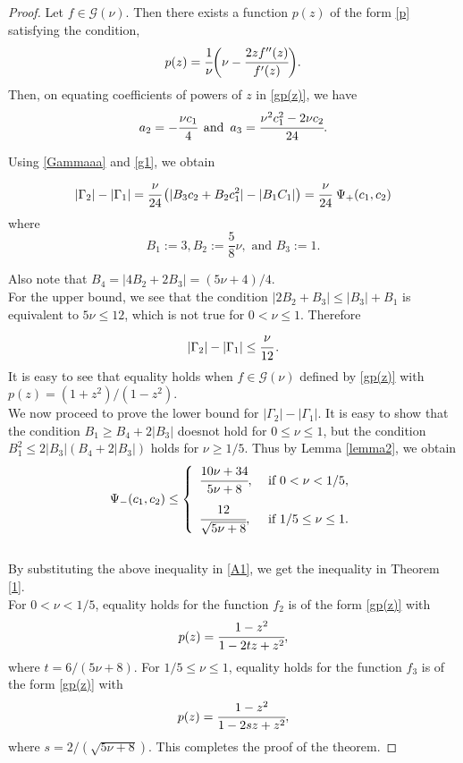 \documentclass[a4paper,12pt]{amsart}
\theoremstyle{definition}
\numberwithin{equation}{section}
\begin{document}
 
\begin{proof}
Let $f\in \mathcal{G}(\nu)$. Then there exists a function $p(z)$ of the form \eqref{p} satisfying  the condition,
 \begin{equation}\label{gp(z)}
 	p(z)=\cfrac{1}{\nu} \bigg(\nu- \cfrac{2zf''(z)}{f'(z)}\bigg).
 \end{equation}
Then, on equating coefficients of powers of $z$ in \eqref{gp(z)}, we have
\begin{equation}\label{g1}
	a_2=-\cfrac{\nu c_1}{4} \,\,\, \text{and} \,\,\,
    a_3=\cfrac{\nu^2 c_1^2-2\nu c_2}{24}.
\end{equation}

\noindent Using \eqref{Gammaaa} and \eqref{g1}, we obtain
\begin{equation}\label{A1}
|\Gamma_2|-|\Gamma_1| = \cfrac{\nu}{24}\left(|B_3 c_2+B_2 c_1^2|-|B_1 C_1|\right)=\cfrac{\nu}{24}\,\,\Psi_+(c_1,c_2)
\end{equation} 
 where $$
	B_1:=3, B_2:=\frac{5}{8}\nu, \mbox{ and } B_3:=1.
	$$
	
\noindent Also note that $B_4=|4B_2+2B_3|=(5\nu+4)/4$.\\[2mm]
\noindent For the upper bound, we see that the condition $|2B_2+B_3| \leq |B_3|+B_1$ is equivalent
to $5 \nu \leq 12$, which is not true for $0< \nu \leq 1$. Therefore	
$$
	|\Gamma_2|-|\Gamma_1| \leq \cfrac{\nu}{12}\,.
$$
It is easy to see that equality holds when $f \in \mathcal{G}(\nu)$ defined by \eqref{gp(z)} with 
	$p(z)=(1+z^2)/(1-z^2)$. \\[2mm]
\noindent We now proceed to prove the lower bound for $|\Gamma_2|-|\Gamma_1|$. It is easy to show that the condition $B_1 \geq B_4 + 2|B_3|$ doesnot hold for $0\leq \nu \leq 1$, but the condition $B_1^2 \leq 2|B_3|(B_4 + 2|B_3|)$ holds for $\nu \geq 1/5$.  Thus by Lemma \ref{lemma2}, we obtain
$$
\Psi_-(c_1,c_2)\le \left \{
\begin{array}{ll}
     \cfrac{10\nu+34}{5\nu+8}, & {\mbox{ if }} 0 < \nu < 1/5,\\[4mm]
	 \cfrac{12}{\sqrt{5\nu+8}}, & {\mbox{ if }} 1/5 \leq \nu \leq 1.
\end{array}
\right.
$$\\
\noindent By substituting the above inequality in \eqref{A1}, we get the inequality in Theorem \ref{1}. \\[1mm]
For $0 < \nu < 1/5$, equality holds for the function $f_2$ is of the form \eqref{gp(z)} with 
$$
p(z)=\cfrac{1-z^2}{1-2tz+z^2},
$$
where $t=6/(5\nu+8)$. For $1/5 \leq \nu \leq 1$, equality holds for the function $f_3$ is of the form \eqref{gp(z)} with 
$$
p(z)=\cfrac{1-z^2}{1-2sz+z^2},
$$
where $s=2/(\sqrt{5\nu+8})$. This completes the proof of the theorem.
\end{proof} 
\end{document}
